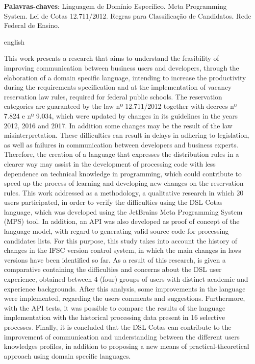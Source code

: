 \begin{resumo}[Resumo]

 \vspace{\onelineskip}
    
 \noindent
 \textbf{Palavras-chaves}: Linguagem de Domínio Específico. Meta Programming System. Lei de Cotas 12.711/2012. Regras para Classificação de Candidatos. Rede Federal de Ensino.
\end{resumo}



\begin{resumo}[Abstract]
\begin{otherlanguage*}{english}

 \noindent
This work presents a research that aims to understand the feasibility of improving communication between business users and developers, through the elaboration of a domain specific language, intending to increase the productivity during the requirements specification and at the implementation of vacancy reservation law rules, required for federal public schools. The reservation categories are guaranteed by the law nº 12.711/2012 together with decrees nº 7.824 e nº 9.034, which were updated by changes in its guidelines in the years 2012, 2016 and 2017. In addition some changes may be the result of the law misinterpretation. These difficulties can result in delays in adhering to legislation, as well as failures in communication between developers and business experts. Therefore, the creation of a language that expresses the distribution rules in a clearer way may assist in the development of processing code with less dependence on technical knowledge in programming, which could contribute to speed up the process of learning and developing new changes on the reservation rules. This work addressed as a methodology, a qualitative research in which 20 users participated, in order to verify the difficulties using the DSL Cotas language, which was developed using the JetBrains Meta Programming System (MPS) tool. In addition, an API was also developed as proof of concept of the language model, with regard to generating valid source code for processing candidates lists. For this purpose, this study takes into account the history of changes in the \gls{IFSC} version control system, in which the main changes in laws versions have been identified so far. As a result of this research, is given a comparative containing the difficulties and concerns about the DSL user experience, obtained between 4 (four) groups of users with distinct academic and experience backgrounds. After this analysis, some improvements in the language were implemented, regarding the users comments and suggestions. Furthermore, with the \gls{API} tests, it was possible to compare the results of the language implementation with the historical processing data present in 16 selective processes. Finally, it is concluded that the DSL Cotas can contribute to the improvement of communication and understanding between the different users knowledges profiles, in addition to proposing a new means of practical-theoretical approach using domain specific languages. 
\end{otherlanguage*}
\end{resumo}
